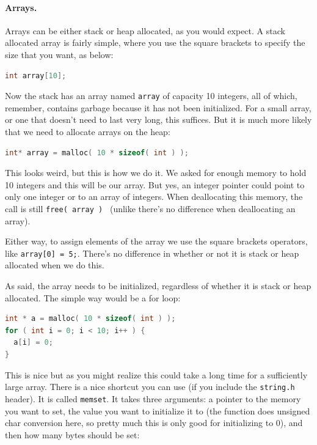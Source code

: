 \paragraph{Arrays.}

Arrays can be either stack or heap allocated, as you would expect. A stack allocated array is fairly simple, where you use the square brackets to specify the size that you want, as below:

\begin{lstlisting}[language=C]
int array[10];
\end{lstlisting}

Now the stack has an array named \texttt{array} of capacity 10 integers, all of which, remember, contains garbage because it has not been initialized. For a small array, or one that doesn't need to last very long, this suffices. But it is much more likely that we need to allocate arrays on the heap:

\begin{lstlisting}[language=C]
int* array = malloc( 10 * sizeof( int ) );
\end{lstlisting}

This looks weird, but this is how we do it. We asked for enough memory to hold 10 integers and this will be our array. But yes, an integer pointer could point to only one integer or to an array of integers. When deallocating this memory, the call is still \texttt{free( array ) } (unlike \Cpp there's no difference when deallocating an array).

Either way, to assign elements of the array we use the square brackets operators, like \texttt{array[0] = 5;}. There's no difference in whether or not it is stack or heap allocated when we do this.

As said, the array needs to be initialized, regardless of whether it is stack or heap allocated. The simple way would be a for loop:

\begin{lstlisting}[language=C]
int * a = malloc( 10 * sizeof( int ) );
for ( int i = 0; i < 10; i++ ) {
  a[i] = 0;
}
\end{lstlisting}

This is nice but as you might realize this could take a long time for a sufficiently large array. There is a nice shortcut you can use (if you include the \texttt{string.h} header). It is called \texttt{memset}. It takes three arguments: a pointer to the memory you want to set, the value you want to initialize it to (the function does unsigned char conversion here, so pretty much this is only good for initializing to 0), and then how many bytes should be set:

